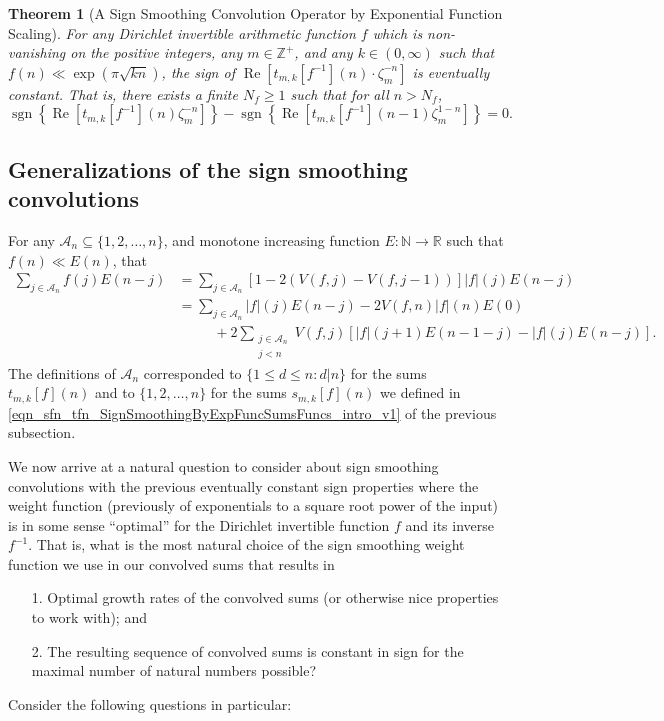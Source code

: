 \documentclass[11pt,reqno]{amsart}
\numberwithin{figure}{section}
\numberwithin{table}{section}
\DeclareMathOperator{\sgn}{sgn}
\renewcommand{\Re}{\operatorname{Re}}
\theoremstyle{plain}
\newtheorem{theorem}{Theorem}
\numberwithin{theorem}{section}
\theoremstyle{definition}
\begin{document}
\begin{theorem}[A Sign Smoothing Convolution Operator by Exponential Function Scaling] 
\label{theorem_MainTheorem_Stmt_v2} 
For any Dirichlet invertible arithmetic function $f$ which is non-vanishing on the positive integers, 
any $m \in \mathbb{Z}^{+}$, and any $k \in (0, \infty)$ such that 
$f(n) \ll \exp(\pi\sqrt{kn})$, the sign of 
$\Re\left[t_{m,k}[f^{-1}](n) \cdot \zeta_m^{-n}\right]$ is eventually constant. 
That is, there exists a finite $N_f \geq 1$ such that for all $n > N_f$, 
\[
\sgn\left\{\Re\left[t_{m,k}[f^{-1}](n) \zeta_m^{-n}\right]\right\} - 
     \sgn\left\{\Re\left[t_{m,k}[f^{-1}](n-1) \zeta_m^{1-n}\right]\right\} = 0. 
\]
\end{theorem} 

\subsection{Generalizations of the sign smoothing convolutions} 

For any $\mathcal{A}_n \subseteq \{1,2,\ldots,n\}$, and monotone increasing function 
$E: \mathbb{N} \rightarrow \mathbb{R}$ such that $f(n) \ll E(n)$, that 
\begin{align*} 
\sum_{j \in \mathcal{A}_n} f(j) E(n-j) & = \sum_{j \in \mathcal{A}_n} \left[ 
     1-2(V(f, j)-V(f, j-1))\right] |f|(j) E(n-j) \\ 
     & = \sum_{j \in \mathcal{A}_n} |f|(j) E(n-j) - 2 V(f, n) |f|(n) E(0) \\ 
     & \phantom{=\quad\ } + 
     2 \sum_{\substack{j \in \mathcal{A}_n \\ j < n}} V(f, j) \left[ 
     |f|(j+1) E(n-1-j) - |f|(j) E(n-j) 
     \right]. 
\end{align*} 
The definitions of $\mathcal{A}_n$ corresponded to 
$\{1 \leq d \leq n: d|n\}$ for the sums $t_{m,k}[f](n)$ and to 
$\{1,2,\ldots,n\}$ for the sums $s_{m,k}[f](n)$ 
we defined in \eqref{eqn_sfn_tfn_SignSmoothingByExpFuncSumsFuncs_intro_v1} of the 
previous subsection. 

We now arrive at a natural question to consider 
about sign smoothing convolutions with the previous eventually constant sign properties 
where the weight function (previously of 
exponentials to a square root power of the input) is in some sense ``optimal'' for the 
Dirichlet invertible function $f$ and its inverse $f^{-1}$. 
That is, what is the most natural choice of the sign smoothing weight function we use in our convolved 
sums that results in 
\begin{itemize} 
\item[1.] Optimal growth rates of the convolved sums (or otherwise nice properties to 
work with); and 
\item[2.] The resulting sequence of convolved sums is constant in sign for the maximal number of 
natural numbers possible? 
\end{itemize} 
Consider the following questions in particular: 
\end{document}
